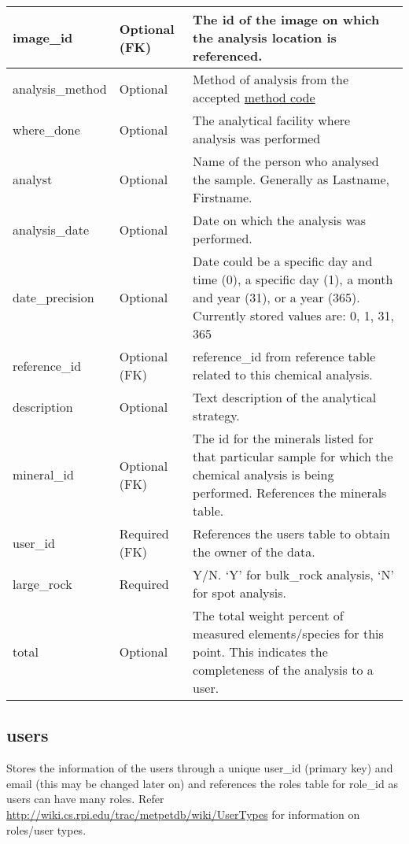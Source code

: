 \documentclass[letterpaper,10pt,english]{sphinxmanual}
\begin{document}
\begin{tabulary}{\linewidth}{|L|L|L|}
image\_id
 & 
Optional (FK)
 & 
The id of the image on which the analysis location is referenced.
\\\hline

analysis\_method
 & 
Optional
 & 
Method of analysis from the accepted \href{http://wiki.cs.rpi.edu/trac/metpetdb/wiki/Methods}{method code}
\\\hline

where\_done
 & 
Optional
 & 
The analytical facility where analysis was performed
\\\hline

analyst
 & 
Optional
 & 
Name of the person who analysed the sample. Generally as Lastname,
Firstname.
\\\hline

analysis\_date
 & 
Optional
 & 
Date on which the analysis was performed.
\\\hline

date\_precision
 & 
Optional
 & 
Date could be a specific day and time (0), a specific day (1),
a month  and year (31), or a year (365). Currently stored values are:
0, 1, 31, 365
\\\hline

reference\_id
 & 
Optional (FK)
 & 
reference\_id from reference table related to this chemical analysis.
\\\hline

description
 & 
Optional
 & 
Text description of the analytical strategy.
\\\hline

mineral\_id
 & 
Optional (FK)
 & 
The id for the minerals listed for that particular sample for
which the chemical analysis is being performed.
References the minerals table.
\\\hline

user\_id
 & 
Required (FK)
 & 
References the users table to obtain the owner of the data.
\\\hline

large\_rock
 & 
Required
 & 
Y/N. ‘Y’ for bulk\_rock analysis, ‘N’ for spot analysis.
\\\hline

total
 & 
Optional
 & 
The total weight percent of measured elements/species for this point.
This indicates the completeness of the analysis to a user.
\\\hline
\end{tabulary}



\subsection{users}
\label{Table_Description:users}
Stores the information of the users through a unique user\_id (primary key) and  email (this may be changed later on) and references the roles table for role\_id as users can have many roles.
Refer \href{http://wiki.cs.rpi.edu/trac/metpetdb/wiki/UserTypes}{http://wiki.cs.rpi.edu/trac/metpetdb/wiki/UserTypes} for information on roles/user types.
\end{document}
